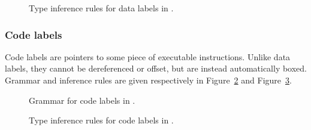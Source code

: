 \begin{figure}[H]
  \centering


  \caption{Type inference rules for data labels in \nstar.}
  \label{fig:nstar-common-expressions-labels-data-typerules}
\end{figure}

\subsubsection{Code labels}\label{subsubsec:nstar-common-expressions-labels-code}

Code labels are pointers to some piece of executable instructions.
Unlike data labels, they cannot be dereferenced or offset, but are instead automatically boxed.
Grammar and inference rules are given respectively in Figure~\ref{fig:nstar-common-expressions-labels-code-grammar} and Figure~\ref{fig:nstar-common-expressions-labels-code-typerules}.

\begin{figure}[H]
  \centering


  \caption{Grammar for code labels in \nstar.}
  \label{fig:nstar-common-expressions-labels-code-grammar}
\end{figure}

\begin{figure}[H]
  \centering


  \caption{Type inference rules for code labels in \nstar.}
  \label{fig:nstar-common-expressions-labels-code-typerules}
\end{figure}


